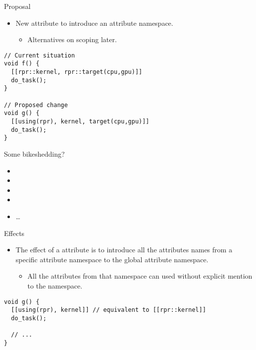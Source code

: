 \begin{frame}[t,fragile]{Proposal}
\begin{itemize}
  \item New attribute to introduce an attribute namespace.
    \begin{itemize}
      \item Alternatives on scoping later.
    \end{itemize}
\end{itemize}

\vfill
\begin{lstlisting}
// Current situation
void f() {
  [[rpr::kernel, rpr::target(cpu,gpu)]]
  do_task();
}

// Proposed change
void g() {
  [[using(rpr), kernel, target(cpu,gpu)]]
  do_task();
}
\end{lstlisting}
\end{frame}

\begin{frame}[t]{Some bikeshedding?}
\begin{itemize}
  \item {}
  \item {}
  \item {}
  \item {}
  \item \ldots
\end{itemize}
\end{frame}

\begin{frame}[t,fragile]{Effects}
\begin{itemize}
  \item The effect of a  attribute is to introduce all the attributes
        names from a specific attribute namespace to the global attribute namespace.
    \begin{itemize}
      \item All the attributes from that namespace
            can used without explicit mention to the namespace.
    \end{itemize}
\end{itemize}

\begin{lstlisting}
void g() {
  [[using(rpr), kernel]] // equivalent to [[rpr::kernel]]
  do_task();

  // ...
}
\end{lstlisting}
\end{frame}

